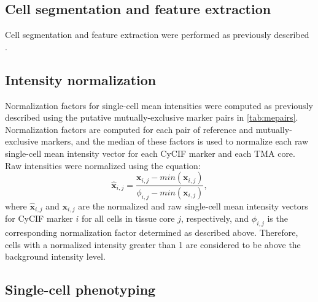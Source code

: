 \documentclass[preprint,review,3p,12pt]{elsarticle}
\begin{document}
\subsection{Cell segmentation and feature extraction}
Cell segmentation and feature extraction were performed as previously described \cite{cmif2020}.

\subsection{Intensity normalization}
Normalization factors for single-cell mean intensities were computed as previously described \cite{Chang2020} using the putative mutually-exclusive marker pairs in \autoref{tab:mepairs}. Normalization factors are computed for each pair of reference and mutually-exclusive markers, and the median of these factors is used to normalize each raw single-cell mean intensity vector for each CyCIF marker and each TMA core. Raw intensities were normalized using the equation:
\begin{equation}
\label{eq:norm}
\hat{\mathbf{x}}_{i,j} = \frac{\mathbf{x}_{i,j}-min(\mathbf{x}_{i,j})}{\phi_{i,j}-min(\mathbf{x}_{i,j})},
\end{equation}
where $\hat{\mathbf{x}}_{i,j}$ and $\mathbf{x}_{i,j}$ are the normalized and raw single-cell mean intensity vectors for CyCIF marker $i$ for all cells in tissue core $j$, respectively, and $\phi_{i,j}$ is the corresponding normalization factor determined as described above. Therefore, cells with a normalized intensity greater than 1 are considered to be above the background intensity level.

\subsection{Single-cell phenotyping}
\end{document}
